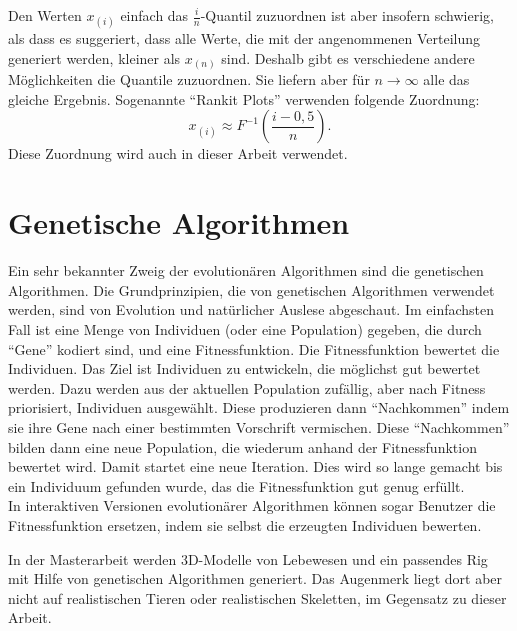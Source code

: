 Den Werten $x_{(i)}$ einfach das $\frac{i}{n}$-Quantil zuzuordnen ist aber insofern schwierig, als dass es suggeriert, dass alle Werte, die mit der angenommenen Verteilung generiert werden, kleiner als $x_{(n)}$ sind. Deshalb gibt es verschiedene andere Möglichkeiten die Quantile zuzuordnen. Sie liefern aber für $n \rightarrow \infty$ alle das gleiche Ergebnis. Sogenannte "`Rankit Plots"' verwenden folgende Zuordnung:
\[ x_{(i)} \approx F^{-1}\left(\frac{i - 0{,}5}{n}\right). \]
Diese Zuordnung wird auch in dieser Arbeit verwendet.


\section{Genetische Algorithmen}
\label{genetic_algorithms}

Ein sehr bekannter Zweig der evolutionären Algorithmen sind die genetischen Algorithmen.
Die Grundprinzipien, die von genetischen Algorithmen verwendet werden, sind von Evolution und natürlicher Auslese abgeschaut. Im einfachsten Fall ist eine Menge von Individuen (oder eine Population) gegeben, die durch "`Gene"' kodiert sind, und eine Fitnessfunktion. Die Fitnessfunktion bewertet die Individuen. Das Ziel ist Individuen zu entwickeln, die möglichst gut bewertet werden. 
Dazu werden aus der aktuellen Population zufällig, aber nach Fitness priorisiert, Individuen ausgewählt. Diese produzieren dann "`Nachkommen"' indem sie ihre Gene nach einer bestimmten Vorschrift vermischen.
Diese "`Nachkommen"' bilden dann eine neue Population, die wiederum anhand der Fitnessfunktion bewertet wird. Damit startet eine neue Iteration.
Dies wird so lange gemacht bis ein Individuum gefunden wurde, das die Fitnessfunktion gut genug erfüllt. \cite{Holland} \cite[Abschnitt 1.3.1]{EvolutionaryDesign_Introduction}\\
In interaktiven Versionen evolutionärer Algorithmen können sogar Benutzer die Fitnessfunktion ersetzen, indem sie selbst die erzeugten Individuen bewerten. \cite{InteractiveEvolutionaryComputation}

In der Masterarbeit \cite{JonHudson} werden 3D-Modelle von Lebewesen und ein passendes Rig mit Hilfe von genetischen Algorithmen generiert. Das Augenmerk liegt dort aber nicht auf realistischen Tieren oder realistischen Skeletten, im Gegensatz zu dieser Arbeit.
